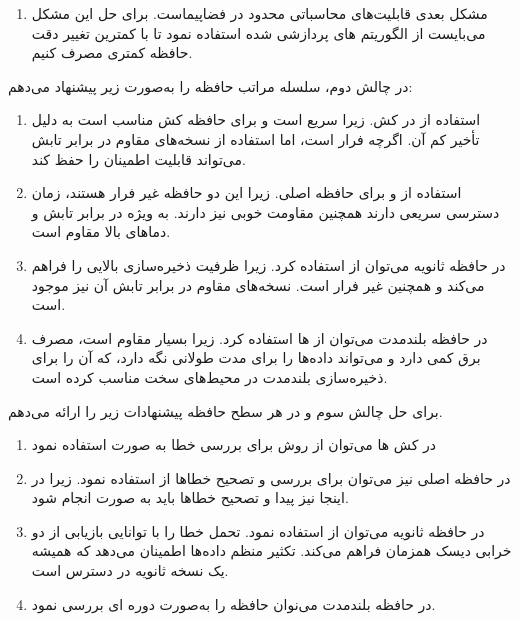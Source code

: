 \documentclass[12pt]{exam}
\begin{document}
\begin{questions}
\begin{enumerate}
	\item 
	مشکل بعدی قابلیت‌های محاسباتی محدود در فضاپیماست. برای حل این مشکل می‌بایست از الگوریتم های پردازشی  شده استفاده نمود تا با کمترین تغییر دقت حافظه کمتری مصرف کنیم.
\end{enumerate}



در چالش  دوم، سلسله مراتب حافظه را به‌صورت زیر پیشنهاد می‌دهم:

\begin{enumerate}
	\item استفاده از  در کش. زیرا  سریع است و برای حافظه کش مناسب است به دلیل تأخیر کم آن. اگرچه فرار است، اما استفاده از نسخه‌های مقاوم در برابر تابش می‌تواند قابلیت اطمینان را حفظ کند.
	
	\item 
	استفاده از  و  برای حافظه اصلی. زیرا این دو حافظه  غیر فرار هستند، زمان دسترسی سریعی دارند همچنین مقاومت خوبی نیز دارند.  به ویژه در برابر تابش و دماهای بالا مقاوم است.
	
	\item 
	در حافظه ثانویه می‌توان از  استفاده کرد. زیرا  ظرفیت ذخیره‌سازی بالایی را فراهم می‌کند و همچنین غیر فرار است. نسخه‌های مقاوم در برابر تابش آن نیز موجود است.
	
	\item 
	در حافظه بلند‌مدت می‌توان از  ها استفاده کرد. زیرا بسیار مقاوم است، مصرف برق کمی دارد و می‌تواند داده‌ها را برای مدت طولانی نگه دارد، که آن را برای ذخیره‌سازی بلندمدت در محیط‌های سخت مناسب کرده است.
\end{enumerate}


برای حل چالش سوم و در هر سطح حافظه پیشنهادات زیر را ارائه می‌دهم.

\begin{enumerate}
	\item در کش ها می‌توان از روش  برای بررسی خطا به صورت  استفاده نمود
	
	\item 
	 در حافظه اصلی نیز می‌توان برای بررسی و تصحیح خطاها از  استفاده نمود. زیرا در اینجا نیز پیدا و تصحیح خطاها باید به صورت  انجام شود.
	 
	 \item 
	 در حافظه ثانویه می‌توان از  استفاده نمود.  تحمل خطا را با توانایی بازیابی از دو خرابی دیسک همزمان فراهم می‌کند. تکثیر منظم داده‌ها اطمینان می‌دهد که همیشه یک نسخه ثانویه در دسترس است.
	 
	 \item 
	 در حافظه بلندمدت می‌نوان حافظه را به‌صورت دوره ای بررسی نمود.
\end{enumerate}
















\end{questions}
\end{document}
